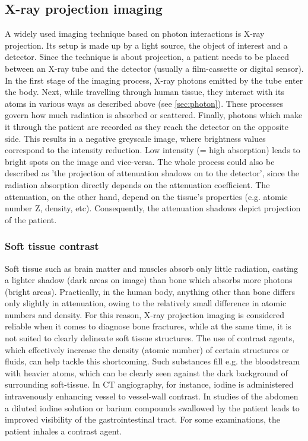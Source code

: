 \subsection{X-ray projection imaging}
A widely used imaging technique based on photon interactions is X-ray projection.
Its setup is made up by a light source, the object of interest and a detector.
Since the technique is about projection, a patient needs to be placed between an X-ray tube and the detector (usually a film-cassette or digital sensor).
In the first stage of the imaging process, X-ray photons emitted by the tube enter the body.
Next, while travelling through human tissue, they interact with its atoms in various ways as described above (see \ref{sec:photon}).
These processes govern how much radiation is absorbed or scattered.
Finally, photons which make it through the patient are recorded as they reach the detector on the opposite side.
This results in a negative greyscale image, where brightness values correspond to the intensity reduction.
Low intensity (= high absorption) leads to bright spots on the image and vice-versa.
The whole process could also be described as 'the projection of attenuation shadows on to the detector', since the radiation absorption directly depends on the attenuation coefficient. The attenuation, on the other hand, depend on the tissue's properties (e.g. atomic number Z, density, etc).
Consequently, the attenuation shadows depict projection of the patient.

\subsubsection{Soft tissue contrast}
\label{sec:soft}
Soft tissue such as brain matter and muscles absorb only little radiation, casting a lighter shadow (dark areas on image) than bone which absorbs more photons (bright areas).
Practically, in the human body, anything other than bone differs only slightly in attenuation, owing to the relatively small difference in atomic numbers and density.
For this reason, X-ray projection imaging is considered reliable when it comes to diagnose bone fractures, while at the same time, it is not suited to clearly delineate soft tissue structures.
The use of contrast agents, which effectively increase the density (atomic number) of certain structures or fluids, can help tackle this shortcoming.
Such substances fill e.g. the bloodstream with heavier atoms, which can be clearly seen against the dark background of surrounding soft-tissue.
In CT angiography, for instance, iodine is administered intravenously enhancing vessel to vessel-wall contrast.
In studies of the abdomen a diluted iodine solution or barium compounds swallowed by the patient leads to improved visibility of the gastrointestinal tract.
For some examinations, the patient inhales a contrast agent.

